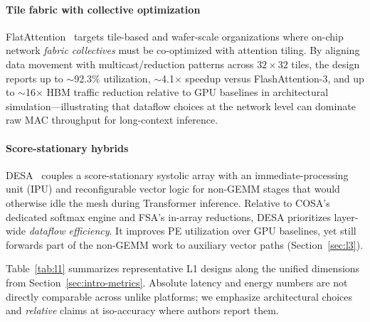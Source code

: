 \documentclass[conference]{IEEEtran}
\begin{document}
\paragraph{Tile fabric with collective optimization}
FlatAttention~\cite{flatattention2026} targets tile-based and wafer-scale organizations where on-chip network \emph{fabric collectives} must be co-optimized with attention tiling.
By aligning data movement with multicast/reduction patterns across $32 \times 32$ tiles, the design reports up to $\sim$92.3\% utilization, $\sim$4.1$\times$ speedup versus FlashAttention-3, and up to $\sim$16$\times$ HBM traffic reduction relative to GPU baselines in architectural simulation---illustrating that dataflow choices at the network level can dominate raw MAC throughput for long-context inference.

\paragraph{Score-stationary hybrids}
DESA~\cite{desa2025} couples a score-stationary systolic array with an immediate-processing unit (IPU) and reconfigurable vector logic for non-GEMM stages that would otherwise idle the mesh during Transformer inference.
Relative to COSA's dedicated softmax engine and FSA's in-array reductions, DESA prioritizes layer-wide \emph{dataflow efficiency}.
It improves PE utilization over GPU baselines, yet still forwards part of the non-GEMM work to auxiliary vector paths (Section~\ref{sec:l3}).

Table~\ref{tab:l1} summarizes representative L1 designs along the unified dimensions from Section~\ref{sec:intro-metrics}.
Absolute latency and energy numbers are not directly comparable across unlike platforms; we emphasize architectural choices and \emph{relative} claims at iso-accuracy where authors report them.

\begin{table}[t]
\caption{Representative FlashAttention-native accelerator designs (L1).
Util.\ = PE or layer utilization; eval.\ = dominant evaluation level.}
\label{tab:l1}
\centering
\scriptsize
\setlength{\tabcolsep}{2pt}
\renewcommand{\arraystretch}{1.05}
\end{table}
\end{document}
